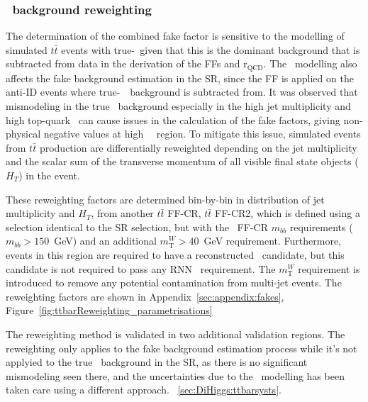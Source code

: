 \subsubsection{\ttbar\ background reweighting}
\label{sec:ttbar-reweighting}
The determination of the combined fake factor 
is sensitive to the modelling of simulated $t\bar{t}$ events with true-\tauhad\
given that this is the dominant background that is subtracted from data in the derivation of
the FFs and $\mathrm{r}_\text{QCD}$.
The \ttbar\ modelling also affects the fake background estimation in the SR,
since the FF is applied on the anti-ID events where true-\tauhad\ \ttbar\ 
background is subtracted from.
It was observed that mismodeling in the true \ttbar\ background 
especially in the high jet multiplicity and high top-quark \pt\ 
can cause issues in the calculation of the fake factors, 
giving non-physical negative values at high \tauhad\ \pt\ region. 
To mitigate this issue,
simulated events from $t\bar{t}$ production are differentially reweighted
depending on the jet multiplicity and the scalar sum of the transverse momentum of all visible
final state objects ($H_T$) in the event.

These reweighting factors are determined bin-by-bin 
in distribution of jet multiplicity and $H_T$,
from another $t\bar{t}$ FF-CR, $t\bar{t}$ FF-CR2,
which is defined using a selection identical to the SR selection,
but with the \ttbar\ FF-CR $m_{bb}$ requirements ($m_{bb}>150$~GeV)
and an additional $m^{W}_\text{T}>40$~GeV requirement. 
Furthermore, events in this region are required
to have a reconstructed \tauhad\ candidate, but this candidate is not required
to pass any RNN \tauhad\ requirement.
The $m^{W}_\text{T}$ requirement is introduced to remove any potential contamination from multi-jet events.
The reweighting factors are shown in Appendix~\ref{sec:appendix:fakes}, 
Figure~\ref{fig:ttbarReweighting_parametrisations}

The reweighting method is validated in two additional validation regions.
The reweighting only applies to the fake background estimation process
while it's not applyied to the true \ttbar\ background in the SR, 
as there is no significant mismodeling seen there, and
the uncertainties due to the \ttbar\ modelling has been taken care using a different approach.
~\ref{sec:DiHiggs:ttbarsysts}.


